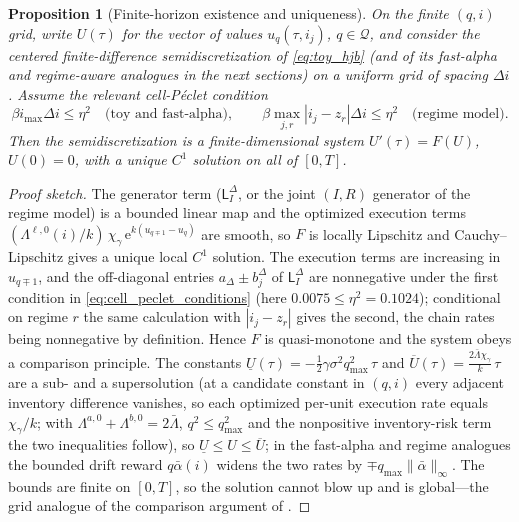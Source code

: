 \documentclass[11pt,a4paper]{article}
\newcommand{\Qcal}{\mathcal{Q}}
\newcommand{\e}{\mathrm e}
\newcommand{\alphabar}{\bar\alpha}
\theoremstyle{plain}
\newtheorem{proposition}{Proposition}[section]
\theoremstyle{definition}
\begin{document}
\begin{proposition}[Finite-horizon existence and uniqueness]
\label{prop:finite_horizon}
On the finite \((q,i)\) grid, write \(U(\tau)\) for the vector of values
\(u_q(\tau,i_j)\), \(q\in\Qcal\), and consider the centered finite-difference
semidiscretization of \eqref{eq:toy_hjb} (and of its fast-alpha and regime-aware
analogues in the next sections) on a uniform grid of spacing \(\Delta i\).
Assume the relevant cell-P\'eclet condition
\begin{equation}
\beta i_{\max}\Delta i\le\eta^2
\quad\text{(toy and fast-alpha)},
\qquad
\beta\max_{j,r}|i_j-z_r|\Delta i\le\eta^2
\quad\text{(regime model)}.
\label{eq:cell_peclet_conditions}
\end{equation}
Then the semidiscretization is a finite-dimensional system
\(U'(\tau)=F(U)\),
\(U(0)=0\), with a unique \(C^1\) solution on all of \([0,T]\).
\end{proposition}

\begin{proof}[Proof sketch]
The generator term (\(\mathsf L_I^\Delta\), or the joint \((I,R)\) generator
of the regime model) is a bounded linear map and the optimized execution terms
\((\Lambda^{\ell,0}(i)/k)\,\chi_\gamma\,\e^{k(u_{q\mp1}-u_q)}\) are smooth, so
\(F\) is locally Lipschitz and Cauchy--Lipschitz gives a unique local \(C^1\)
solution.  The execution terms are increasing in \(u_{q\mp1}\), and the
off-diagonal entries \(a_\Delta\pm b_j^\Delta\) of \(\mathsf L_I^\Delta\) are
nonnegative under the first condition in \eqref{eq:cell_peclet_conditions}
(here \(0.0075\le\eta^2=0.1024\)); conditional on regime \(r\) the same
calculation with \(|i_j-z_r|\) gives the second, the chain rates being
nonnegative by definition.  Hence \(F\) is quasi-monotone and the system obeys
a comparison principle.  The constants
\(\underline U(\tau)=-\tfrac12\gamma\sigma^2q_{\max}^2\,\tau\) and
\(\overline U(\tau)=\tfrac{2\bar\Lambda\chi_\gamma}{k}\,\tau\) are a sub- and a
supersolution (at a candidate constant in \((q,i)\) every adjacent inventory
difference vanishes, so each optimized per-unit execution rate equals
\(\chi_\gamma/k\); with \(\Lambda^{a,0}+\Lambda^{b,0}=2\bar\Lambda\),
\(q^2\le q_{\max}^2\) and the nonpositive inventory-risk term the two
inequalities follow), so \(\underline U\le U\le\overline U\); in the
fast-alpha and regime analogues the bounded drift reward \(q\alphabar(i)\)
widens the two rates by \(\mp q_{\max}\|\alphabar\|_\infty\).  The bounds are
finite on \([0,T]\), so the solution cannot blow up and is global---the grid
analogue of the comparison argument of \cite{Gueant2017}.
\end{proof}
\end{document}
